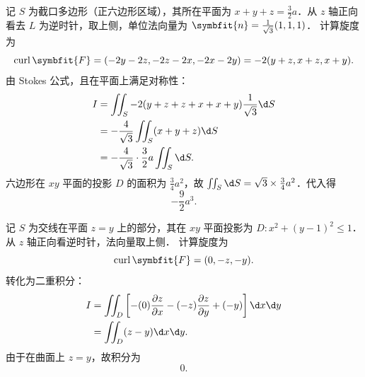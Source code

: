 \begin{solution}
    记 $S$ 为截口多边形（正六边形区域），其所在平面为 $x+y+z = \frac{3}{2}a$．从 $z$ 轴正向看去 $L$ 为逆时针，取上侧，单位法向量为 $\symbfit{n} = \frac{1}{\sqrt{3}}(1, 1, 1)$．
    计算旋度为
    \begin{equation}
        \label{eq:curl-3}
        \operatorname{curl} \symbfit{F} = (-2y-2z, -2z-2x, -2x-2y) = -2(y+z, x+z, x+y).
    \end{equation}
    由 Stokes 公式，且在平面上满足对称性：
    \begin{equation}
        \label{eq:stokes-3}
        \begin{aligned}
            I & = \iint_S -2(y+z+z+x+x+y) \frac{1}{\sqrt{3}} \d S      \\
              & = -\frac{4}{\sqrt{3}} \iint_S (x+y+z) \d S             \\
              & = -\frac{4}{\sqrt{3}} \cdot \frac{3}{2}a \iint_S \d S.
        \end{aligned}
    \end{equation}
    六边形在 $xy$ 平面的投影 $D$ 的面积为 $\frac{3}{4}a^2$，故 $\iint_S \d S = \sqrt{3} \times \frac{3}{4}a^2$．代入得
    \begin{equation}
        \label{eq:res-3}
        \boxed{-\frac{9}{2}a^3}.
    \end{equation}


    记 $S$ 为交线在平面 $z=y$ 上的部分，其在 $xy$ 平面投影为 $D \colon x^2+(y-1)^2 \leqslant 1$．从 $z$ 轴正向看逆时针，法向量取上侧．
    计算旋度为
    \begin{equation}
        \label{eq:curl-4}
        \operatorname{curl} \symbfit{F} = (0, -z, -y).
    \end{equation}
    转化为二重积分：
    \begin{equation}
        \label{eq:stokes-4}
        \begin{aligned}
            I & = \iint_D \left[ -(0)\frac{\partial z}{\partial x} - (-z)\frac{\partial z}{\partial y} + (-y) \right] \d x \d y \\
              & = \iint_D (z - y) \d x \d y.
        \end{aligned}
    \end{equation}
    由于在曲面上 $z=y$，故积分为
    \begin{equation}
        \label{eq:res-4}
        \boxed{0}.
    \end{equation}



\end{solution}
